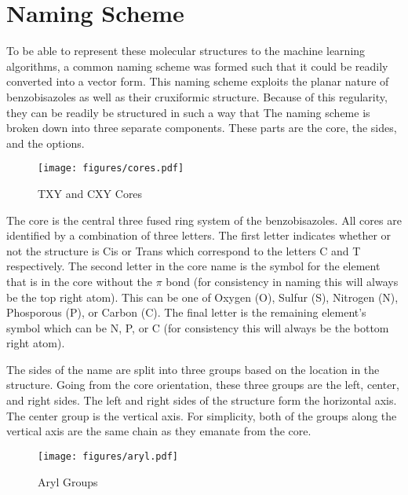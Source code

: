 \documentclass[10pt]{article}
\begin{document}
\section{Naming Scheme}

To be able to represent these molecular structures to the machine learning algorithms, a common naming scheme was formed such that it could be readily converted into a vector form. This naming scheme exploits the planar nature of benzobisazoles as well as their cruxiformic structure. Because of this regularity, they can be readily be structured in such a way that
The naming scheme is broken down into three separate components. These parts are the core, the sides, and the options.

\begin{figure}[H]
  \begin{center}
    \texttt{[image: figures/cores.pdf]}
  \end{center}
  \caption{TXY and CXY Cores}
  \label{fig:cores}
\end{figure}

The core is the central three fused ring system of the benzobisazoles. All cores are identified by a combination of three letters. The first letter indicates whether or not the structure is Cis or Trans which correspond to the letters C and T respectively. The second letter in the core name is the symbol for the element that is in the core without the $\pi$ bond (for consistency in naming this will always be the top right atom). This can be one of Oxygen (O), Sulfur (S), Nitrogen (N), Phosporous (P), or Carbon (C). The final letter is the remaining element's symbol which can be N, P, or C (for consistency this will always be the bottom right atom).

The sides of the name are split into three groups based on the location in the structure. Going from the core orientation, these three groups are the left, center, and right sides. The left and right sides of the structure form the horizontal axis. The center group is the vertical axis. For simplicity, both of the groups along the vertical axis are the same chain as they emanate from the core.

\begin{figure}[H]
  \begin{center}
    \texttt{[image: figures/aryl.pdf]}
  \end{center}
  \caption{Aryl Groups}
  \label{fig:aryl}
\end{figure}
\end{document}
